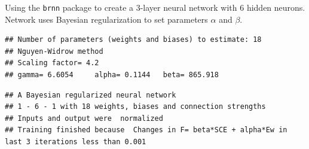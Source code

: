 Using the \texttt{brnn} package \cite{brnn} to create a 3-layer neural
network with 6 hidden neurons. Network uses Bayesian regularization to
set parameters \(\alpha\) and \(\beta\).

\begin{Shaded}
\begin{Highlighting}[]
\OtherTok{\textless{}{-}}\SpecialCharTok{$}
\OtherTok{\textless{}{-}}\SpecialCharTok{$}

\OtherTok{\textless{}{-}} \SpecialCharTok{\textasciitilde{}}\NormalTok{)   }
\end{Highlighting}
\end{Shaded}

\begin{verbatim}
## Number of parameters (weights and biases) to estimate: 18 
## Nguyen-Widrow method
## Scaling factor= 4.2 
## gamma= 6.6054     alpha= 0.1144   beta= 865.918
\end{verbatim}

\begin{Shaded}
\begin{Highlighting}[]
\end{Highlighting}
\end{Shaded}

\begin{verbatim}
## A Bayesian regularized neural network 
## 1 - 6 - 1 with 18 weights, biases and connection strengths
## Inputs and output were  normalized
## Training finished because  Changes in F= beta*SCE + alpha*Ew in last 3 iterations less than 0.001
\end{verbatim}

\begin{Shaded}
\begin{Highlighting}[]
\OtherTok{\textless{}{-}}  \NormalTok{(} \NormalTok{))}
\SpecialCharTok{/}\NormalTok{(}\SpecialCharTok{\^{}}
\end{Highlighting}
\end{Shaded}


